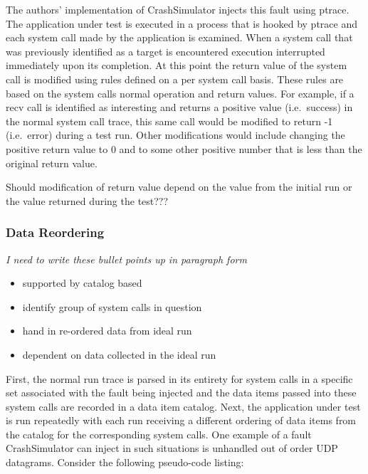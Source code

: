             The authors' implementation of CrashSimulator injects this fault using ptrace. The application under test is
            executed in a process that is hooked by ptrace and each system call made by the application is examined.
            When a system call that was previously identified as a target is encountered execution interrupted
            immediately upon its completion. At this point the return value of the system call is modified using rules
            defined on a per system call basis. These rules are based on the system calls normal operation and return
            values. For example, if a recv call is identified as interesting and returns a positive value (i.e.\ success)
            in the normal system call trace, this same call would be modified to return -1 (i.e.\ error) during a test
            run. Other modifications would include changing the positive return value to 0 and to some other positive
            number that is less than the original return value.

            Should modification of return value depend on the value from the initial run or the value returned during
            the test???

        \subsubsection{Data Reordering}

        \emph{I need to write these bullet points up in paragraph form}
        \begin{itemize}
            \item{supported by catalog based}
            \item{identify group of system calls in question}
            \item{hand in re-ordered data from ideal run}
            \item{dependent on data collected in the ideal run}
        \end{itemize}


            First, the normal run trace is parsed in its entirety for system calls in a specific set
            associated with the fault being injected and the data items passed into these system calls are recorded in a
            data item catalog. Next, the application under test is run repeatedly with each run receiving a different
            ordering of data items from the catalog for the corresponding system calls. One example of a fault
            CrashSimulator can inject in such situations is unhandled out of order UDP datagrams. Consider the following
            pseudo-code listing:

